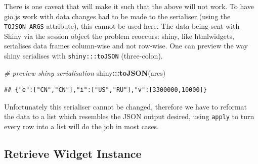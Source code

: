 \documentclass[
]{krantz}
\makeatletter
\newenvironment{Shaded}{\begin{snugshade}}{\end{snugshade}}
\newcommand{\CommentTok}[1]{\textcolor[rgb]{0.37,0.37,0.37}{\textit{#1}}}
\newcommand{\ControlFlowTok}[1]{\textcolor[rgb]{0.27,0.27,0.27}{\textbf{#1}}}
\newcommand{\DataTypeTok}[1]{\textcolor[rgb]{0.27,0.27,0.27}{#1}}
\newcommand{\DecValTok}[1]{\textcolor[rgb]{0.06,0.06,0.06}{#1}}
\newcommand{\KeywordTok}[1]{\textcolor[rgb]{0.27,0.27,0.27}{\textbf{#1}}}
\newcommand{\NormalTok}[1]{#1}
\newcommand{\OperatorTok}[1]{\textcolor[rgb]{0.43,0.43,0.43}{\textbf{#1}}}
\newcommand{\StringTok}[1]{\textcolor[rgb]{0.5,0.5,0.5}{#1}}
\newenvironment{kframe}{%
\medskip{}
\setlength{\fboxsep}{.8em}
 \def\at@end@of@kframe{}%
 \ifinner\ifhmode%
  \def\at@end@of@kframe{\end{minipage}}%
  \begin{minipage}{\columnwidth}%
 \fi\fi%
 \def\FrameCommand##1{\hskip\@totalleftmargin \hskip-\fboxsep
 \colorbox{shadecolor}{##1}\hskip-\fboxsep
     \hskip-\linewidth \hskip-\@totalleftmargin \hskip\columnwidth}%
 \MakeFramed {\advance\hsize-\width
   \@totalleftmargin\z@ \linewidth\hsize
   \@setminipage}}%
 {\par\unskip\endMakeFramed%
 \at@end@of@kframe}
\renewenvironment{Shaded}{\begin{kframe}}{\end{kframe}}
\makeatother
\begin{document}
There is one caveat that will make it such that the above will not work. To have gio.js work with data changes had to be made to the serialiser (using the \texttt{TOJSON\_ARGS} attribute), this cannot be used here. The data being sent with Shiny via the session object the problem reoccurs: shiny, like htmlwidgets, serialises data frames column-wise and not row-wise. One can preview the way shiny serialises with \texttt{shiny:::toJSON} (three-colon).

\begin{Shaded}
\begin{Highlighting}[]
\CommentTok{\# preview shiny serialisation}
\NormalTok{shiny}\OperatorTok{:::}\KeywordTok{toJSON}\NormalTok{(arcs)}
\end{Highlighting}
\end{Shaded}

\begin{verbatim}
## {"e":["CN","CN"],"i":["US","RU"],"v":[3300000,10000]}
\end{verbatim}

Unfortunately this serialiser cannot be changed, therefore we have to reformat the data to a list which resembles the JSON output desired, using \texttt{apply} to turn every row into a list will do the job in most cases.

\begin{Shaded}
\end{Shaded}

\hypertarget{shiny-widgets-retrieve}{%
\subsection{Retrieve Widget Instance}\label{shiny-widgets-retrieve}}
\end{document}
